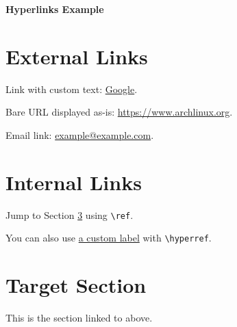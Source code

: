\documentclass[11pt]{article}
\begin{document}
\centerline{\Large\bf Hyperlinks Example}\par
\bigskip

\section{External Links}

Link with custom text: \href{https://www.google.com}{Google}.

Bare URL displayed as-is: \url{https://www.archlinux.org}.

Email link: \href{mailto:example@example.com}{example@example.com}.

\section{Internal Links}

Jump to Section \ref{sec:target} using \texttt{\textbackslash ref}.

You can also use \hyperref[sec:target]{a custom label} with \texttt{\textbackslash hyperref}.

\section{Target Section}
\label{sec:target}

This is the section linked to above.
\end{document}
